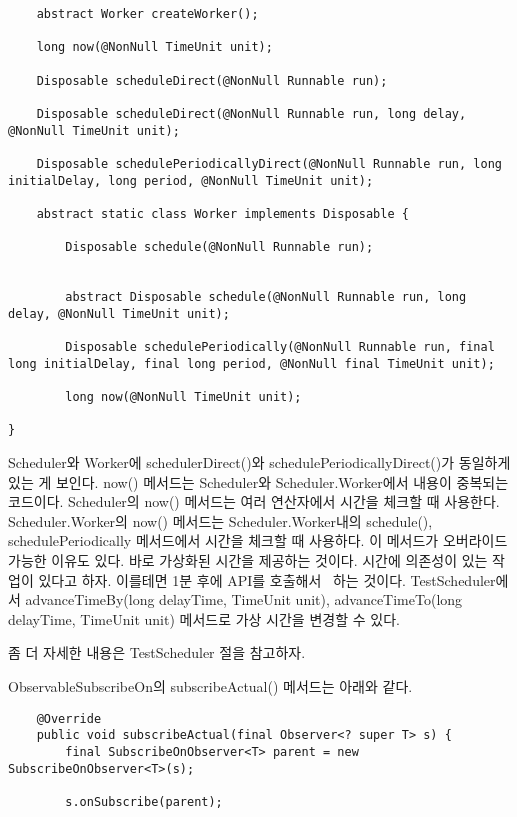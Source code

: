 \documentclass{book}
\begin{document}
{\begin{verbatim}
    abstract Worker createWorker();

    long now(@NonNull TimeUnit unit);

    Disposable scheduleDirect(@NonNull Runnable run);
    
    Disposable scheduleDirect(@NonNull Runnable run, long delay, @NonNull TimeUnit unit);

    Disposable schedulePeriodicallyDirect(@NonNull Runnable run, long initialDelay, long period, @NonNull TimeUnit unit);
    
    abstract static class Worker implements Disposable {
        
        Disposable schedule(@NonNull Runnable run);

       
        abstract Disposable schedule(@NonNull Runnable run, long delay, @NonNull TimeUnit unit);

        Disposable schedulePeriodically(@NonNull Runnable run, final long initialDelay, final long period, @NonNull final TimeUnit unit);

        long now(@NonNull TimeUnit unit);

}
\end{verbatim}

Scheduler와 Worker에 schedulerDirect()와 schedulePeriodicallyDirect()가 동일하게 있는 게 보인다.
now() 메서드는 Scheduler와 Scheduler.Worker에서 내용이 중복되는 코드이다. 
Scheduler의 now() 메서드는 여러 연산자에서 시간을 체크할 때 사용한다.
Scheduler.Worker의 now() 메서드는 Scheduler.Worker내의 schedule(), schedulePeriodically 메서드에서 시간을 체크할 때 사용하다.
이 메서드가 오버라이드 가능한 이유도 있다. 바로 가상화된 시간을 제공하는 것이다.
시간에 의존성이 있는 작업이 있다고 하자. 이를테면 1분 후에 API를 호출해서 ~하는 것이다.
TestScheduler에서 advanceTimeBy(long delayTime, TimeUnit unit), advanceTimeTo(long delayTime, TimeUnit unit) 메서드로 가상 시간을 변경할 수 있다.

좀 더 자세한 내용은 TestScheduler 절을 참고하자.

ObservableSubscribeOn의 subscribeActual() 메서드는 아래와 같다.
\begin{verbatim}
    @Override
    public void subscribeActual(final Observer<? super T> s) {
        final SubscribeOnObserver<T> parent = new SubscribeOnObserver<T>(s);

        s.onSubscribe(parent);


\end{verbatim}}
\end{document}
